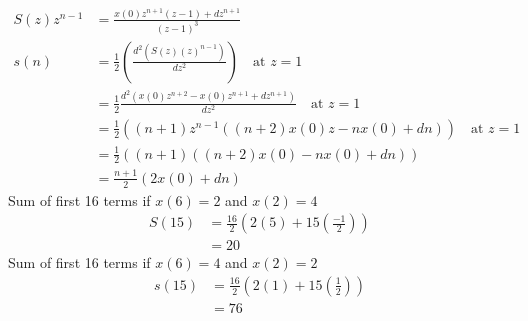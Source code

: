 \documentclass[journal,12pt,onecolumn]{IEEEtran}
\theoremstyle{remark}
\providecommand{\brak}[1]{\ensuremath{\left(#1\right)}}
\begin{document}
\begin{align}
    S\brak{z}z^{n-1} & = \frac{x\brak{0}z^{n+1}\brak{z-1} + d z^{n+1}}{\brak{z-1}^3}                                        \\
    s\brak{n}        & =\frac{1}{2} \brak{\frac{d^{2}\brak{S\brak{z}\brak{z}^{n-1}}}{dz^2}} \quad \text{at } z=1            \\
                     & = \frac{1}{2} \frac{d^2\brak{x\brak{0}z^{n+2}-x\brak{0}z^{n+1}+dz^{n+1}}}{dz^2}\quad \text{at } z=1  \\
                     & =\frac{1}{2}\brak{\brak{n+1}z^{n-1}\brak{\brak{n+2}x\brak{0}z -nx\brak{0} +dn}} \quad \text{at } z=1 \\
                     & = \frac{1}{2} \brak{\brak{n+1}\brak{\brak{n+2}x\brak{0} -nx\brak{0} +dn}}                            \\
                     & = \frac{n+1}{2}\brak{2x\brak{0} +dn}
\end{align}
Sum of first 16 terms if $x\brak{6} = 2$ and $x\brak{2} = 4$
\begin{align}
    S\brak{15} & = \frac{16}{2} \brak{2\brak{5} + 15\brak{\frac{-1}{2}}} \\
               & =20
\end{align}
Sum of first 16 terms if $x\brak{6} =4$ and $x\brak{2}=2$
\begin{align}
    s\brak{15} & = \frac{16}{2}\brak{2\brak{1} + 15 \brak{\frac{1}{2}}} \\
               & =76
\end{align}
\end{document}
